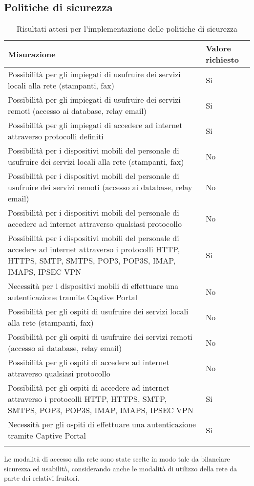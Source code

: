 \documentclass[Tesi.tex]{subfiles}
\begin{document}
\subsection{Politiche di sicurezza}
\label{table:Risultati attesi per l'implementazione delle politiche di sicurezza}
\renewcommand*{\arraystretch}{1.2}
\begin{longtable}[H]{p{9.5cm}p{3.4cm}}
	\rowcolor{CHeader}
	\color{CHeaderText} \textbf{Misurazione} & \color{CHeaderText} \textbf{Valore richiesto} \\
	\endhead
	Possibilità per gli impiegati di usufruire dei servizi locali alla rete (stampanti, fax) &
	Si \\
	Possibilità per gli impiegati di usufruire dei servizi remoti (accesso ai database, relay email) &
	Si \\
	Possibilità per gli impiegati di accedere ad internet attraverso protocolli definiti &
	Si \\
	Possibilità per i dispositivi mobili del personale di usufruire dei servizi locali alla rete (stampanti, fax) &
	No \\
	Possibilità per i dispositivi mobili del personale di usufruire dei servizi remoti (accesso ai database, relay email) &
	No \\
	Possibilità per i dispositivi mobili del personale di accedere ad internet attraverso qualsiasi protocollo &
	No \\
	Possibilità per i dispositivi mobili del personale di accedere ad internet attraverso i protocolli HTTP, HTTPS, SMTP, SMTPS, POP3, POP3S, IMAP, IMAPS, IPSEC VPN &
	Si \\
	Necessità per i dispositivi mobili di effettuare una autenticazione tramite Captive Portal &
	No \\
	Possibilità per gli ospiti di usufruire dei servizi locali alla rete (stampanti, fax) &
	No \\
	Possibilità per gli ospiti di usufruire dei servizi remoti (accesso ai database, relay email) &
	No \\
	Possibilità per gli ospiti di accedere ad internet attraverso qualsiasi protocollo &
	No \\
	Possibilità per gli ospiti di accedere ad internet attraverso i protocolli HTTP, HTTPS, SMTP, SMTPS, POP3, POP3S, IMAP, IMAPS, IPSEC VPN &
	Si \\
	Necessità per gli ospiti di effettuare una autenticazione tramite Captive Portal &
	Si \\
	\hiderowcolors
	\caption{Risultati attesi per l'implementazione delle politiche di sicurezza}
\end{longtable}
Le modalità di accesso alla rete sono state scelte in modo tale da bilanciare sicurezza ed usabilità, considerando anche le modalità di utilizzo della rete da parte dei relativi fruitori.
\end{document}
